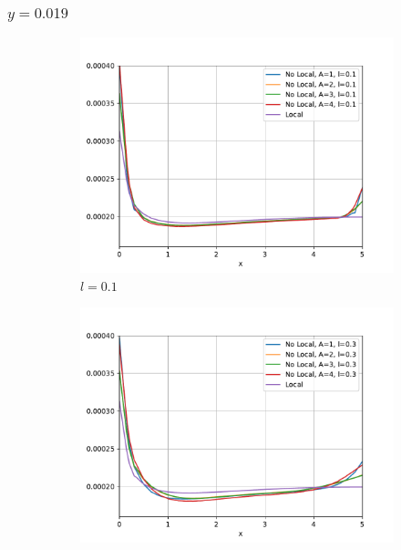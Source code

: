 	\subsubsection{\texorpdfstring{$y=0.019$}{y=0.019}}
		\begin{figure}
		    \centering
		    \sffamily
		    \begin{subfigure}{0.48\textwidth}
		    \centering
		        \includegraphics[width=\textwidth]{figuras/Placa/Perfiles/Y/Y0.1_0.019.pdf}
		        \caption{$l=0.1$}
		        \label{fig:perfilesY0019.01}
		    \end{subfigure}
		    \begin{subfigure}{0.48\textwidth}
		    \centering
		        \includegraphics[width=\textwidth]{figuras/Placa/Perfiles/Y/Y0.3_0.019.pdf}

\end{subfigure}
\end{figure}
